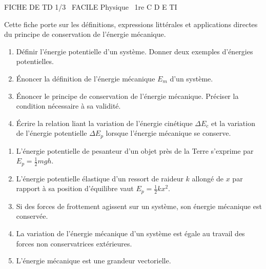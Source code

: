 \documentclass[11pt]{article}
\begin{document}
\begin{tcolorbox}[enhanced,colback=popink,colframe=popink,arc=10pt,boxrule=0pt,left=12pt,right=12pt,top=9pt,bottom=9pt]
{\color{white}\popxbold\small FICHE DE TD 1/3 \textbullet\ FACILE \hfill Physique \textbullet\ 1re C D E TI\par}
\end{tcolorbox}
\vspace{4pt}
Cette fiche porte sur les définitions, expressions littérales et applications directes du principe de conservation de l'énergie mécanique.

\begin{exercice}
\begin{enumerate}
    \item Définir l'énergie potentielle d'un système. Donner deux exemples d'énergies potentielles.
    \item Énoncer la définition de l'énergie mécanique $E_m$ d'un système.
    \item Énoncer le principe de conservation de l'énergie mécanique. Préciser la condition nécessaire à sa validité.
    \item Écrire la relation liant la variation de l'énergie cinétique $\Delta E_c$ et la variation de l'énergie potentielle $\Delta E_p$ lorsque l'énergie mécanique se conserve.
\end{enumerate}
\end{exercice}

\begin{exercice}
\begin{enumerate}
    \item L'énergie potentielle de pesanteur d'un objet près de la Terre s'exprime par $E_p = \frac{1}{2}mgh$.
    \item L'énergie potentielle élastique d'un ressort de raideur $k$ allongé de $x$ par rapport à sa position d'équilibre vaut $E_p = \frac{1}{2}kx^2$.
    \item Si des forces de frottement agissent sur un système, son énergie mécanique est conservée.
    \item La variation de l'énergie mécanique d'un système est égale au travail des forces non conservatrices extérieures.
    \item L'énergie mécanique est une grandeur vectorielle.
\end{enumerate}
\end{exercice}
\end{document}

